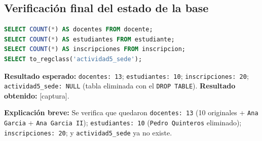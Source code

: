 \subsection{Verificación final del estado de la base}

\begin{lstlisting}[language=sql]
SELECT COUNT(*) AS docentes FROM docente;
SELECT COUNT(*) AS estudiantes FROM estudiante;
SELECT COUNT(*) AS inscripciones FROM inscripcion;
SELECT to_regclass('actividad5_sede');
\end{lstlisting}

\noindent
\textbf{Resultado esperado:} \texttt{docentes: 13}; \texttt{estudiantes: 10}; \texttt{inscripciones: 20}; \texttt{actividad5\_sede: NULL} (tabla eliminada con el \texttt{DROP TABLE}). \textbf{Resultado obtenido:} [captura].

\noindent
\textbf{Explicación breve:} Se verifica que quedaron \texttt{docentes: 13} (10 originales + \texttt{Ana Garcia} + \texttt{Ana Garcia II}); \texttt{estudiantes: 10} (\texttt{Pedro Quinteros} eliminado); \texttt{inscripciones: 20}; y \texttt{actividad5\_sede} ya no existe.

\medskip
